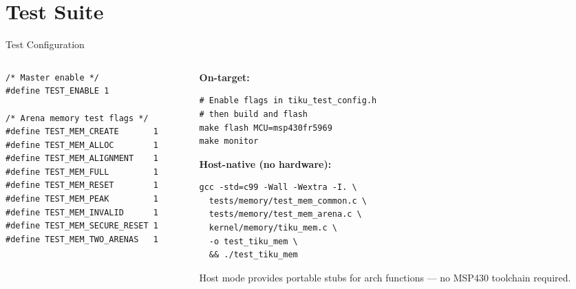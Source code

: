 \documentclass[aspectratio=169, 10pt]{beamer}
\begin{document}
\section{Test Suite}

\begin{frame}[fragile]{Test Configuration}
\begin{columns}[T]
\begin{column}{0.48\textwidth}
\begin{lstlisting}[style=cstyle, title={tests/tiku\_test\_config.h}]
/* Master enable */
#define TEST_ENABLE 1

/* Arena memory test flags */
#define TEST_MEM_CREATE       1
#define TEST_MEM_ALLOC        1
#define TEST_MEM_ALIGNMENT    1
#define TEST_MEM_FULL         1
#define TEST_MEM_RESET        1
#define TEST_MEM_PEAK         1
#define TEST_MEM_INVALID      1
#define TEST_MEM_SECURE_RESET 1
#define TEST_MEM_TWO_ARENAS   1
\end{lstlisting}
\end{column}

\begin{column}{0.48\textwidth}
\textbf{On-target:}
\begin{lstlisting}[style=bashstyle]
# Enable flags in tiku_test_config.h
# then build and flash
make flash MCU=msp430fr5969
make monitor
\end{lstlisting}

\vspace{0.5em}
\textbf{Host-native (no hardware):}
\begin{lstlisting}[style=bashstyle]
gcc -std=c99 -Wall -Wextra -I. \
  tests/memory/test_mem_common.c \
  tests/memory/test_mem_arena.c \
  kernel/memory/tiku_mem.c \
  -o test_tiku_mem \
  && ./test_tiku_mem
\end{lstlisting}

\vspace{0.3em}
Host mode provides portable stubs for arch functions ---
no MSP430 toolchain required.
\end{column}
\end{columns}
\end{frame}
\end{document}
